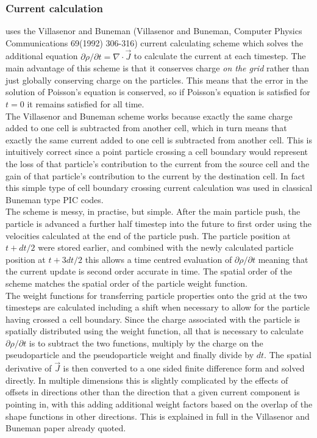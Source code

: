 \documentclass[12pt,a4paper]{article}
\newcommand{\EPOCH}{{\color{warwickdark}\fontfamily{phv}\selectfont{EPOCH}}}
\begin{document}
\subsubsection{Current calculation}
{\EPOCH} uses the Villasenor and Buneman (Villasenor and Buneman, Computer
Physics Communications 69(1992) 306-316) current calculating scheme which
solves the additional equation
${\partial \rho}/{\partial t} = \nabla\cdot\vec{J}$ to
calculate the current at each timestep. The main advantage of this scheme is
that it conserves charge {\it on the grid} rather than just globally conserving
charge on the particles. This means that the error in the solution of Poisson's
equation is conserved, so if Poisson's equation is satisfied for $t = 0$ it
remains satisfied for all time.\\

The Villasenor and Buneman scheme works because exactly the same charge added
to one cell is subtracted from another cell, which in turn means that exactly
the same current added to one cell is subtracted from another cell. This is
intuitively correct since a point particle crossing a cell boundary would
represent the loss of that particle's contribution to the current from the
source cell and the gain of that particle's contribution to the current by the
destination cell. In fact this simple type of cell boundary crossing
current calculation was used in classical Buneman type PIC codes.\\

The scheme is messy, in practise, but simple. After the main particle push, the
particle is advanced a further half timestep into the future to first order
using the velocities calculated at the end of the particle push. The particle
position at $t + dt/2$ were stored earlier, and combined with the newly
calculated particle position at $t + {3dt}/{2}$ this allows a time centred
evaluation of ${\partial \rho}/{\partial t}$ meaning that the current
update is second order accurate in time. The spatial order of the scheme
matches the spatial order of the particle weight function.\\

The weight functions for transferring particle properties onto the grid at the
two timesteps are calculated including a shift when necessary to allow for the
particle having crossed a cell boundary. Since the charge associated with the
particle is spatially distributed using the weight function, all that is
necessary to calculate ${\partial \rho}/{\partial t}$ is to subtract the
two functions, multiply by the charge on the pseudoparticle and the
pseudoparticle weight and finally divide by $dt$. The spatial derivative of
$\vec{J}$ is then converted to a one sided finite difference form and solved
directly. In multiple dimensions this is slightly complicated by the effects of
offsets in directions other than the direction that a given current component
is pointing in, with this adding additional weight factors based on the overlap
of the shape functions in other directions. This is explained in full in the
Villasenor and Buneman paper already quoted.\\
\end{document}
